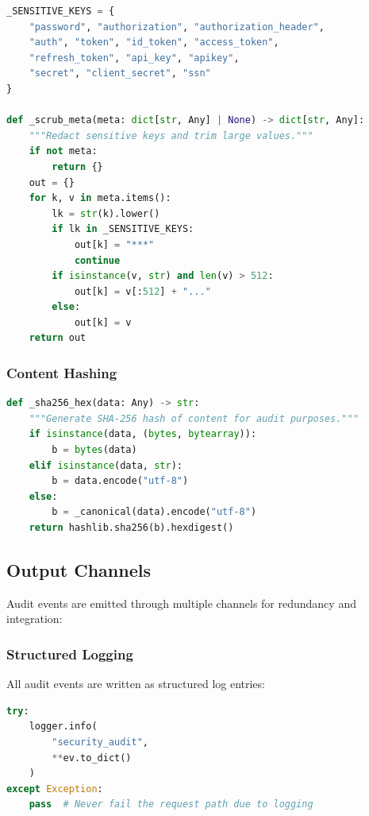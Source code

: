 \begin{lstlisting}[language=Python,caption={Sensitive metadata scrubbing}]
_SENSITIVE_KEYS = {
    "password", "authorization", "authorization_header",
    "auth", "token", "id_token", "access_token", 
    "refresh_token", "api_key", "apikey", 
    "secret", "client_secret", "ssn"
}

def _scrub_meta(meta: dict[str, Any] | None) -> dict[str, Any]:
    """Redact sensitive keys and trim large values."""
    if not meta:
        return {}
    out = {}
    for k, v in meta.items():
        lk = str(k).lower()
        if lk in _SENSITIVE_KEYS:
            out[k] = "***"
            continue
        if isinstance(v, str) and len(v) > 512:
            out[k] = v[:512] + "..."
        else:
            out[k] = v
    return out
\end{lstlisting}

\subsubsection{Content Hashing}

\begin{lstlisting}[language=Python,caption={Content hashing for audit records}]
def _sha256_hex(data: Any) -> str:
    """Generate SHA-256 hash of content for audit purposes."""
    if isinstance(data, (bytes, bytearray)):
        b = bytes(data)
    elif isinstance(data, str):
        b = data.encode("utf-8")
    else:
        b = _canonical(data).encode("utf-8")
    return hashlib.sha256(b).hexdigest()
\end{lstlisting}

\subsection{Output Channels}
\label{subsec:audit-channels}

Audit events are emitted through multiple channels for redundancy and integration:

\subsubsection{Structured Logging}

All audit events are written as structured log entries:

\begin{lstlisting}[language=Python,caption={Structured log emission}]
try:
    logger.info(
        "security_audit",
        **ev.to_dict()
    )
except Exception:
    pass  # Never fail the request path due to logging
\end{lstlisting}

